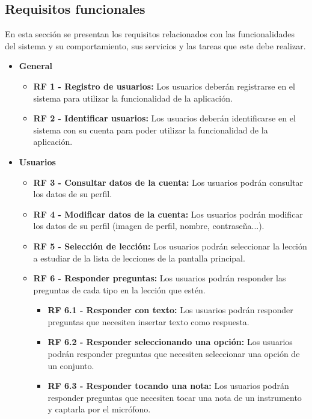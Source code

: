 \subsection{Requisitos funcionales}
En esta sección se presentan los requisitos relacionados con las funcionalidades del sistema y su comportamiento, sus servicios y las tareas que este debe realizar.

\begin{itemize}
    \item \textbf{General}
          \begin{itemize}
              \item \textbf{RF 1 - Registro de usuarios: }Los usuarios deberán registrarse en el sistema para utilizar la funcionalidad de la aplicación.
              \item \textbf{RF 2 - Identificar usuarios: }Los usuarios deberán identificarse en el sistema con su cuenta para poder utilizar la funcionalidad de la aplicación.

          \end{itemize}
    \item \textbf{Usuarios}
          \begin{itemize}
              \item \textbf{RF 3 - Consultar datos de la cuenta: }Los usuarios podrán consultar los datos de su perfil.
              \item \textbf{RF 4 - Modificar datos de la cuenta: }Los usuarios podrán modificar los datos de su perfil (imagen de perfil, nombre, contraseña...).
              \item \textbf{RF 5 - Selección de lección: }Los usuarios podrán seleccionar la lección a estudiar de la lista de lecciones de la pantalla principal.
              \item \textbf{RF 6 - Responder preguntas: }Los usuarios podrán responder las preguntas de cada tipo en la lección que estén.
                    \begin{itemize}
                        \item \textbf{RF 6.1 - Responder con texto: }Los usuarios podrán responder preguntas que necesiten insertar texto como respuesta.
                        \item \textbf{RF 6.2 - Responder seleccionando una opción: }Los usuarios podrán responder preguntas que necesiten seleccionar una opción de un conjunto.
                        \item \textbf{RF 6.3 - Responder tocando una nota: }Los usuarios podrán responder preguntas que necesiten tocar una nota de un instrumento y captarla por el micrófono.
                    \end{itemize}


\end{itemize}
\end{itemize}
